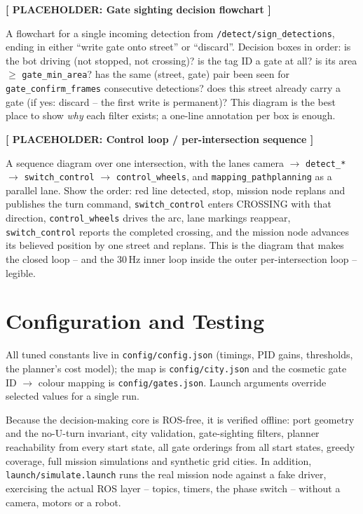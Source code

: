 \documentclass[10pt,a4paper]{article}
\newenvironment{placeholder}[1]
  {\par\medskip\noindent\begin{center}
   \setlength{\fboxsep}{6pt}%
   \begin{lrbox}{\placebox}%
   \begin{minipage}{0.88\linewidth}
   \centering\textbf{[ PLACEHOLDER: #1 ]}\\[0.8em]
   \raggedright\footnotesize}
  {\end{minipage}\end{lrbox}\fbox{\usebox{\placebox}}\end{center}\medskip}
\begin{document}
\begin{placeholder}{Gate sighting decision flowchart}
  A flowchart for a single incoming detection from
  \texttt{/detect/sign\_detections}, ending in either ``write gate onto street''
  or ``discard''. Decision boxes in order: is the bot driving (not stopped, not
  crossing)? is the tag ID a gate at all? is its area $\geq$
  \texttt{gate\_min\_area}? has the same (street, gate) pair been seen for
  \texttt{gate\_confirm\_frames} consecutive detections? does this street
  already carry a gate (if yes: discard -- the first write is permanent)? This
  diagram is the best place to show \emph{why} each filter exists; a one-line
  annotation per box is enough.
\end{placeholder}

\begin{placeholder}{Control loop / per-intersection sequence}
  A sequence diagram over one intersection, with the lanes
  camera $\rightarrow$ \texttt{detect\_*} $\rightarrow$ \texttt{switch\_control}
  $\rightarrow$ \texttt{control\_wheels}, and \texttt{mapping\_pathplanning} as
  a parallel lane. Show the order: red line detected, stop, mission node
  replans and publishes the turn command, \texttt{switch\_control} enters
  CROSSING with that direction, \texttt{control\_wheels} drives the arc, lane
  markings reappear, \texttt{switch\_control} reports the completed crossing,
  and the mission node advances its believed position by one street and replans.
  This is the diagram that makes the closed loop -- and the 30\,Hz inner loop
  inside the outer per-intersection loop -- legible.
\end{placeholder}

\section{Configuration and Testing}

All tuned constants live in \texttt{config/config.json} (timings, PID gains,
thresholds, the planner's cost model); the map is \texttt{config/city.json} and
the cosmetic gate ID $\rightarrow$ colour mapping is \texttt{config/gates.json}.
Launch arguments override selected values for a single run.

Because the decision-making core is ROS-free, it is verified offline: port
geometry and the no-U-turn invariant, city validation, gate-sighting filters,
planner reachability from every start state, all gate orderings from all start
states, greedy coverage, full mission simulations and synthetic grid cities.
In addition, \texttt{launch/simulate.launch} runs the real mission node against
a fake driver, exercising the actual ROS layer -- topics, timers, the phase
switch -- without a camera, motors or a robot.
\end{document}
